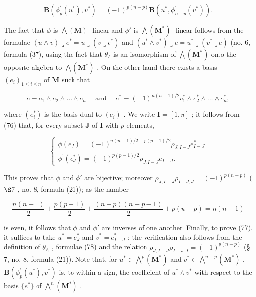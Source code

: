 \[
\mathbf {B} \left(\phi_ {p} ^ {\prime} (u ^ {*}), v ^ {*}\right) = (- 1) ^ {p (n - p)} \mathbf {B} \left(u ^ {*}, \phi_ {n - p} ^ {\prime} (v ^ {*})\right).\tag{77}
\]

The fact that \(\phi\) is \(\bigwedge (\mathbf{M})\) -linear and \(\phi'\) is \(\bigwedge (\mathbf{M}^*)\) -linear follows from the formulae \((u \wedge v) \lrcorner e^* = u \lrcorner (v \lrcorner e^*)\) and \((u^* \wedge v^*) \lrcorner e = u^* \lrcorner (v^* \lrcorner e)\) (no. 6, formula (37), using the fact that \(\theta_{\wedge}\) is an isomorphism of \(\bigwedge (\mathbf{M}^*)\) onto the opposite algebra to \(\bigwedge (\mathbf{M}^*)\) . On the other hand there exists a basis \((e_i)_{1 \leq i \leq n}\) of \(\mathbf{M}\) such that

\[
e = e _ {1} \wedge e _ {2} \wedge \dots \wedge e _ {n} \quad \text { and } \quad e ^ {*} = (- 1) ^ {n (n - 1) / 2} e _ {1} ^ {*} \wedge e _ {2} ^ {*} \wedge \dots \wedge e _ {n} ^ {*},
\]

where \((e_i^*)\) is the basis dual to \((e_i)\) . We write \(\mathbf{I} = [1, n]\) ; it follows from (76) that, for every subset \(\mathbf{J}\) of \(\mathbf{I}\) with \(p\) elements,

\[
\left\{ \begin{array}{l} \phi (e _ {J}) = (- 1) ^ {n (n - 1) / 2 + p (p - 1) / 2} \rho_ {J, I - J} e _ {I - J} ^ {*} \\ \phi^ {\prime} (e _ {J} ^ {*}) = (- 1) ^ {p (p - 1) / 2} \rho_ {J, I - J} e _ {I - J}. \end{array} \right.\tag{78}
\]

This proves that \(\phi\) and \(\phi'\) are bijective; moreover \(\rho_{J,I-J}\rho_{I-J,J}=(-1)^{p(n-p)}\) ( \(\S 7\) , no. 8, formula (21)); as the number

\[
\frac {n (n - 1)}{2} + \frac {p (p - 1)}{2} + \frac {(n - p) (n - p - 1)}{2} + p (n - p) = n (n - 1)
\]

is even, it follows that \(\phi\) and \(\phi'\) are inverses of one another. Finally, to prove (77), it suffices to take \(u^{*} = e_{J}^{*}\) and \(v^{*} = e_{I - J}^{*}\) ; the verification also follows from the definition of \(\theta_{\wedge}\) , formulae (78) and the relation \(\rho_{J,I - J}\rho_{I - J,J} = (-1)^{p(n - p)}\) (§ 7, no. 8, formula (21)). Note that, for \(u^{*}\in \bigwedge^{p}(\mathbf{M}^{*})\) and \(v^{*}\in \bigwedge^{n - p}(\mathbf{M}^{*})\) , \(\mathbf{B}(\phi_{p}^{\prime}(u^{*}), v^{*})\) is, to within a sign, the coefficient of \(u^{*} \wedge v^{*}\) with respect to the basis \(\{e^{*}\}\) of \(\bigwedge^{n}(\mathbf{M}^{*})\) .

